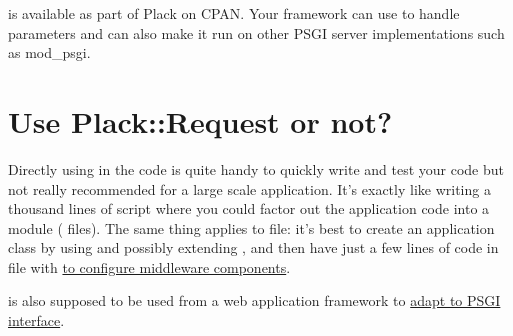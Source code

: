  is available as part of Plack on CPAN. Your framework can
use  to handle parameters and can also make it run on
other PSGI server implementations such as mod\_psgi.

\section{Use Plack::Request or not?}\label{use-plackrequest-or-not}

Directly using  in the  code is quite
handy to quickly write and test your code but not really recommended for
a large scale application. It's exactly like writing a thousand lines of
 script where you could factor out the application code
into a module ( files). The same thing applies to
 file: it's best to create an application class by
using and possibly extending , and then have just a few
lines of code in  file with
\href{http://advent.plackperl.org/2009/12/day-11-using-plackbuilder.html}{
to configure middleware components}.

 is also supposed to be used from a web application
framework to
\href{http://advent.plackperl.org/2009/12/day-8-adapting-web-frameworks-to-psgi.html}{adapt
to PSGI interface}.

